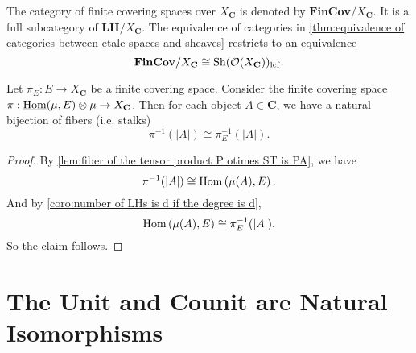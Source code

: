 The category of finite covering spaces over $X_{\mathbf{C}}$ is denoted by $\mathbf{FinCov}/X_{\mathbf{C}}$. It is a full subcategory of $\mathbf{LH}/X_{\mathbf{C}}$. The equivalence of categories in \cref{thm:equivalence of categories between etale spaces and sheaves} restricts to an equivalence
\[ \mathbf{FinCov}/X_{\mathbf{C}} \cong \operatorname{Sh}(\mathcal{O}(X_{\mathbf{C}}))_{\operatorname{lcf}}. \]

\begin{corollary}
Let $\pi_E : E \to X_{\mathbf{C}}$ be a finite covering space. Consider the finite covering space $\pi : \underline{\operatorname{Hom}}(\operatorname{\mu},E) \otimes \operatorname{\mu} \to X_{\mathbf{C}}$. Then for each object $A \in \mathbf{C}$, we have a natural bijection of fibers (i.e. stalks)
\[ \pi^{-1}(|A|) \cong \pi_E^{-1}(|A|). \]
\end{corollary}
\begin{proof}
By \cref{lem:fiber of the tensor product P otimes ST is PA}, we have
\[ \pi^{-1}(|A|) \cong \operatorname{Hom}\left(\operatorname{\mu}(A), E \right). \]
And by \cref{coro:number of LHs is d if the degree is d},
\[ \operatorname{Hom}\left(\operatorname{\mu}(A), E \right) \cong \pi_E^{-1}(|A|). \]
So the claim follows.
\end{proof}

\section{The Unit and Counit are Natural Isomorphisms}

